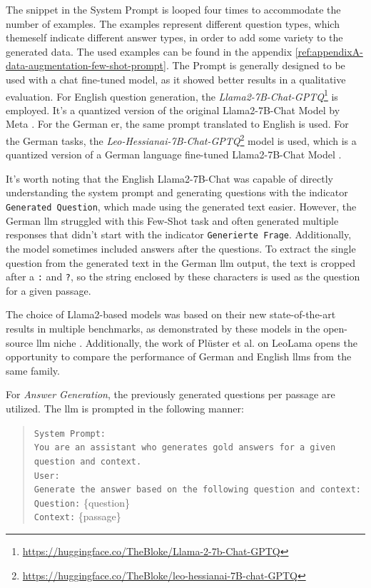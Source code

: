 The snippet in the System Prompt is looped four times to accommodate the number of examples. The examples represent different question types, which themeself indicate different answer types, in order to add some variety to the generated data. The used examples can be found in the appendix \ref{ref:appendixA-data-augmentation-few-shot-prompt}. The Prompt is generally designed to be used with a chat fine-tuned model, as it showed better results in a qualitative evaluation. For English question generation, the \textit{Llama2-7B-Chat-GPTQ}\footnote{\url{https://huggingface.co/TheBloke/Llama-2-7b-Chat-GPTQ}} is employed. It's a quantized version of the original Llama2-7B-Chat Model by Meta \cite{touvron_llama_2023}. For the German \gls{er}, the same prompt translated to English is used. For the German tasks, the \textit{Leo-Hessianai-7B-Chat-GPTQ}\footnote{\url{https://huggingface.co/TheBloke/leo-hessianai-7B-chat-GPTQ}} model is used, which is a quantized version of a German language fine-tuned Llama2-7B-Chat Model \cite{pluster_leolm_2023}.

It's worth noting that the English Llama2-7B-Chat was capable of directly understanding the system prompt and generating questions with the indicator \texttt{Generated Question}, which made using the generated text easier. However, the German \gls{llm} struggled with this Few-Shot task and often generated multiple responses that didn't start with the indicator \texttt{Generierte Frage}. Additionally, the model sometimes included answers after the questions. To extract the single question from the generated text in the German \gls{llm} output, the text is cropped after a \texttt{:} and \texttt{?}, so the string enclosed by these characters is used as the question for a given passage. 

The choice of Llama2-based models was based on their new state-of-the-art results in multiple benchmarks, as demonstrated by these models in the open-source \gls{llm} niche \cite{touvron_llama_2023}. Additionally, the work of Plüster et al. \cite{pluster_leolm_2023} on LeoLama opens the opportunity to compare the performance of German and English \gls{llm}s from the same family.

For \textit{Answer Generation}, the previously generated questions per passage are utilized. The \gls{llm} is prompted in the following manner:

\begin{quote}
    \texttt{System Prompt:}\\
    \texttt{You are an assistant who generates gold answers for a given question and context.}\\
    \texttt{User:}\\
    \texttt{Generate the answer based on the following question and context:}\\
    \texttt{Question:} \{question\} \\
    \texttt{Context:} \{passage\}
\end{quote}


